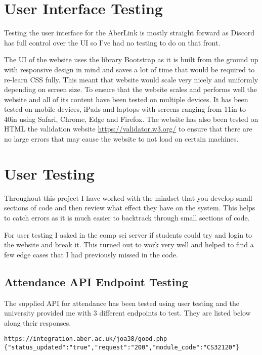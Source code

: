 \section{User Interface Testing}
Testing the user interface for the AberLink is mostly straight forward as Discord has full control over the UI so I've had no testing to do on that front.

The UI of the website uses the library Bootstrap \cite{bootstrap} as it is built from the ground up with responsive design in mind and saves a lot of time that would be required to re-learn CSS fully. This meant that website would scale very nicely and uniformly depending on screen size. To ensure that the website scales and performs well the website and all of its content have been tested on multiple devices. It has been tested on mobile devices, iPads and laptops with screens ranging from 11in to 40in using Safari, Chrome, Edge and Firefox. The website has also been tested on HTML the validation website \href{https://validator.w3.org/}{https://validator.w3.org/} to ensure that there are no large errors that may cause the website to not load on certain machines.

\section{User Testing}\label{sec4:user-tesing}
Throughout this project I have worked with the mindset that you develop small sections of code and then review what effect they have on the system. This helps to catch errors as it is much easier to backtrack through small sections of code.

For user testing I asked in the comp sci server if students could try and login to the website and break it. This turned out to work very well and helped to find a few edge cases that I had previously missed in the code.

\subsection{Attendance API Endpoint Testing}
The supplied API for attendance has been tested using user testing and the university provided me with 3 different endpoints to test. They are listed below along their responses.

\begin{verbatim}
https://integration.aber.ac.uk/joa38/good.php
{"status_updated":"true","request":"200","module_code":"CS32120"}    
\end{verbatim}

